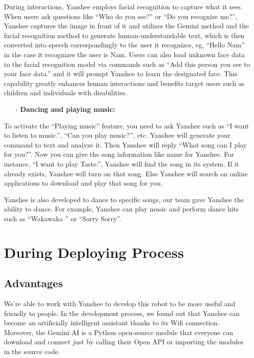 \documentclass[12pt, a4paper]{article}
\begin{document}
During interactions, Yanshee employs facial recognition to capture what it sees. When users ask questions like “Who do you see?” or “Do you recognize me?”, Yanshee captures the image in front of it and utilizes the Gemini method and the facial recognition method to generate human-understandable text, which is then converted into speech correspondingly to the user it recognizes, eg, “Hello Nam” in the case it recognizes the user is Nam. Users can also load unknown face data to the facial recognition model via commands such as “Add this person you see to your face data.” and it will prompt Yanshee to learn the designated face. This capability greatly enhances human interactions and benefits target users such as children and individuals with disabilities.
\begin{itemize}
    \item[-] \textbf{Dancing and playing music:}
\end{itemize}

To activate the “Playing music” feature, you need to ask Yanshee such as “I want to listen to music.”, “Can you play music?”, etc. Yanshee will generate your command to text and analyze it. Then Yanshee will reply “What song can I play for you?”. Now you can give the song information like name for Yanshee. For instance, “I want to play Taste.”, Yanshee will find the song in its system. If it already exists, Yanshee will turn on that song. Else Yanshee will search on online applications to download and play that song for you. 

Yanshee is also developed to dance to specific songs, our team gave Yanshee the ability to dance. For example, Yanshee can play music and perform dance hits such as “Wakawaka '' or “Sorry Sorry”.
\section{During Deploying Process}
\subsection{Advantages}
We're able to work with Yanshee to develop this robot to be more useful and friendly to people. In the development process, we found out that Yanshee can become an artificially intelligent assistant thanks to its Wifi connection. Moreover, the Gemini AI is a Python open-source module that everyone can download and connect just by calling their Open API or importing the modules in the source code.
\end{document}
